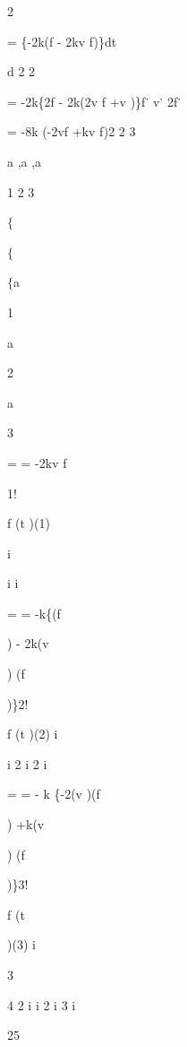 2\par
=  \{-2k(f - 2kv f)\}dt\par
d 2 2\par
= -2k\{2f  - 2k(2v f +v  )\}f˙ v˙ 2f˙\par
= -8k (-2vf +kv f)2 2 3\par
a  ,a  ,a\par
1 2 3\par
$\{$\par
$\{$\par
$\{$a\par
1\par
a\par
2\par
a\par
3\par
=  = -2kv  f\par
1!\par
f (t  )(1)\par
i\par
i i\par
=  = -k\{(f\par
) - 2k(v\par
) (f\par
)\}2!\par
f (t  )(2) i\par
i 2 i 2 i\par
=  = -  k \{-2(v  )(f\par
) +k(v\par
) (f\par
)\}3!\par
f (t\par
)(3) i\par
3\par
4 2 i i 2 i 3 i\par
25\par

